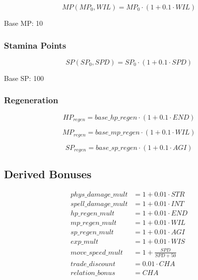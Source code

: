 \documentclass[a4paper,12pt]{article}
\begin{document}
\begin{equation}
MP(MP_0, WIL) = MP_0 \cdot (1 + 0.1 \cdot WIL)
\end{equation}

Base MP: 10

\subsubsection{Stamina Points}

\begin{equation}
SP(SP_0, SPD) = SP_0 \cdot (1 + 0.1 \cdot SPD)
\end{equation}

Base SP: 100



\subsubsection{Regeneration}

\begin{equation}
HP_{regen} = base\_hp\_regen \cdot (1 + 0.1 \cdot END)
\end{equation}

\begin{equation}
MP_{regen} = base\_mp\_regen \cdot (1 + 0.1 \cdot WIL)
\end{equation}

\begin{equation}
SP_{regen} = base\_sp\_regen \cdot (1 + 0.1 \cdot AGI)
\end{equation}



\subsection{Derived Bonuses}

\begin{align}
phys\_damage\_mult &= 1 + 0.01 \cdot STR \\
spell\_damage\_mult &= 1 + 0.01 \cdot INT \\
hp\_regen\_mult &= 1 + 0.01 \cdot END \\
mp\_regen\_mult &= 1 + 0.01 \cdot WIL \\
sp\_regen\_mult &= 1 + 0.01 \cdot AGI \\
exp\_mult &= 1 + 0.01 \cdot WIS \\
move\_speed\_mult &= 1 + \frac{SPD}{SPD + 50} \\
trade\_discount &= 0.01 \cdot CHA \\
relation\_bonus &= CHA
\end{align}
\end{document}
